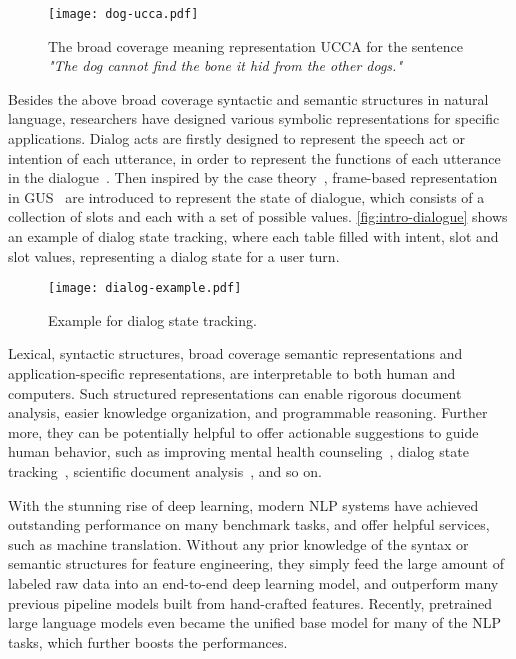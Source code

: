 \begin{figure}[!th]
\centering
\texttt{[image: dog-ucca.pdf]}
\caption{\label{fig:intro-dog-ucca} The broad coverage meaning
  representation UCCA for the sentence \textit{"The dog cannot
    find the bone it hid from the other dogs."}}
\end{figure}

Besides the above broad coverage syntactic and semantic structures in
natural language, researchers have designed various symbolic
representations for specific applications. Dialog acts are firstly
designed to represent the speech act or intention of each utterance,
in order to represent the functions of each utterance in the
dialogue~\citep{wittgenstein2010philosophical,bunt2010towards}. Then
inspired by the case theory~\citep{Fillmore:68}, frame-based
representation in GUS~\citep{bobrow1977gus} are introduced to
represent the state of dialogue, which consists of a collection of
slots and each with a set of possible
values. \autoref{fig:intro-dialogue} shows an example of dialog state
tracking, where each table filled with intent, slot and slot values,
representing a dialog state for a user turn.

\begin{figure}[!th]
\centering
\texttt{[image: dialog-example.pdf]}
\caption{\label{fig:intro-dialogue} Example for dialog state
  tracking.}
\end{figure}

Lexical, syntactic structures, broad coverage semantic representations
and application-specific representations, are interpretable to both
human and computers. Such structured representations can enable
rigorous document analysis, easier knowledge organization, and
programmable reasoning. Further more, they can be potentially helpful
to offer actionable suggestions to guide human behavior, such as
improving mental health counseling~\citep{tanana2016comparison},
dialog state tracking~\citep{budzianowski2018multiwoz}, scientific
document analysis~\citep{dernoncourt2017pubmed}, and so on.

With the stunning rise of deep learning, modern NLP systems have
achieved outstanding performance on many benchmark tasks, and offer
helpful services, such as machine translation. Without any prior
knowledge of the syntax or semantic structures for feature
engineering, they simply feed the large amount of labeled raw data
into an end-to-end deep learning model, and outperform many previous
pipeline models built from hand-crafted features. Recently, pretrained
large language models even became the unified base model for many of
the NLP tasks, which further boosts the performances.

